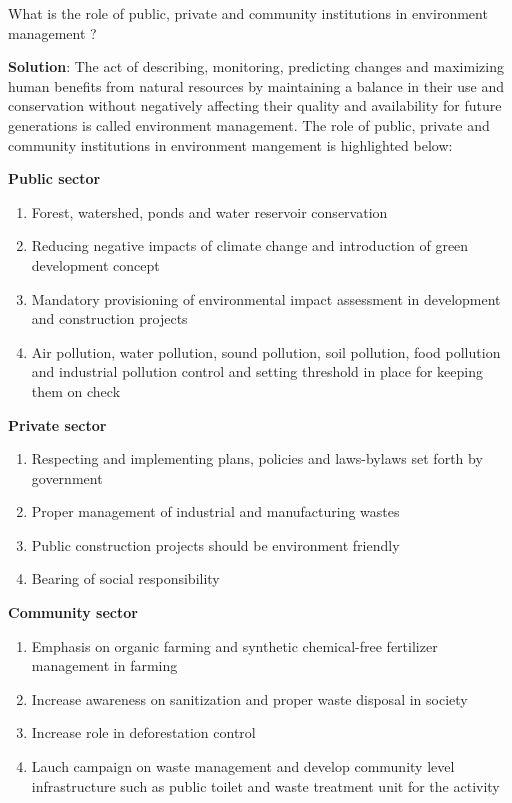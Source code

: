 \documentclass[
]{book}
\newcommand{\question}{\item}
\newenvironment{solution}{ {\bfseries Solution}:}{}
\begin{document}
\begin{questions}
\question What is the role of public, private and community institutions in environment management ?

\begin{solution}
The act of describing, monitoring, predicting changes and maximizing human benefits from natural resources by maintaining a balance in their use and conservation without negatively affecting their quality and availability for future generations is called environment management. The role of public, private and community institutions in environment mangement is highlighted below:

\textbf{Public sector}

\begin{enumerate}
\item Forest, watershed, ponds and water reservoir conservation
\item Reducing negative impacts of climate change and introduction of green development concept
\item Mandatory provisioning of environmental impact assessment in development and construction projects
\item Air pollution, water pollution, sound pollution, soil pollution, food pollution and industrial pollution control and setting threshold in place for keeping them on check
\end{enumerate}

\textbf{Private sector}

\begin{enumerate}
\item Respecting and implementing plans, policies and laws-bylaws set forth by government
\item Proper management of industrial and manufacturing wastes
\item Public construction projects should be environment friendly
\item Bearing of social responsibility
\end{enumerate}

\textbf{Community sector}
\begin{enumerate}
\item Emphasis on organic farming and synthetic chemical-free fertilizer management in farming
\item Increase awareness on sanitization and proper waste disposal in society
\item Increase role in deforestation control
\item Lauch campaign on waste management and develop community level infrastructure such as public toilet and waste treatment unit for the activity
\end{enumerate}


\end{solution}
\end{questions}
\end{document}
